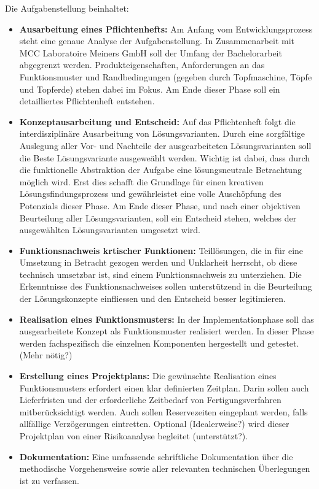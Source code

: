 Die Aufgabenstellung beinhaltet:
\begin{itemize}
	\item \textbf{Ausarbeitung eines Pflichtenhefts:} Am Anfang vom Entwicklungsprozess steht eine genaue Analyse der Aufgabenstellung. In Zusammenarbeit mit MCC Laboratoire Meiners GmbH soll der Umfang der Bachelorarbeit abgegrenzt werden. Produkteigenschaften, Anforderungen an das Funktionsmuster und Randbedingungen (gegeben durch Topfmaschine, Töpfe und Topferde) stehen dabei im Fokus. Am Ende dieser Phase soll ein detailliertes Pflichtenheft entstehen.
	 
	\item \textbf{Konzeptausarbeitung und Entscheid:} Auf das Pflichtenheft folgt die interdisziplinäre Ausarbeitung von Lösungsvarianten. Durch eine sorgfältige Auslegung aller Vor- und Nachteile der ausgearbeiteten Lösungsvarianten soll die Beste Lösungsvariante ausgeweählt werden. Wichtig ist dabei, dass durch die funktionelle Abstraktion der Aufgabe eine lösungsneutrale Betrachtung möglich wird. Erst dies schafft die Grundlage für einen kreativen Lösungsfindungsprozess und gewährleistet eine volle Auschöpfung des Potenzials dieser Phase. Am Ende dieser Phase, und nach einer objektiven Beurteilung aller Lösungsvarianten, soll ein Entscheid stehen, welches der ausgewählten Lösungsvarianten umgesetzt wird.
	
	\item \textbf{Funktionsnachweis krtischer Funktionen:} Teillösungen, die in für eine Umsetzung in Betracht gezogen werden und Unklarheit herrscht, ob diese technisch umsetzbar ist, sind einem Funktionsnachweis zu unterziehen. Die Erkenntnisse des Funktionsnachweises sollen unterstützend in die Beurteilung der Lösungskonzepte einfliessen und den Entscheid besser legitimieren.
	
	\item \textbf{Realisation eines Funktionsmusters:} In der Implementationphase soll das ausgearbeitete Konzept als Funktionsmuster realisiert werden. In dieser Phase werden fachspezifisch die einzelnen Komponenten hergestellt und getestet. (Mehr nötig?)
	
	\item \textbf{Erstellung eines Projektplans:} Die gewünschte Realisation eines Funktionsmusters erfordert einen klar definierten Zeitplan. Darin sollen auch Lieferfristen und der erforderliche Zeitbedarf von Fertigungsverfahren mitberücksichtigt werden. Auch sollen Reservezeiten eingeplant werden, falls allfällige Verzögerungen eintretten. Optional (Idealerweise?) wird dieser Projektplan von einer Risikoanalyse begleitet (unterstützt?).
	
	\item \textbf{Dokumentation:} Eine umfassende schriftliche Dokumentation über die methodische Vorgehensweise sowie aller relevanten technischen Überlegungen ist zu verfassen. 
	
\end{itemize}
